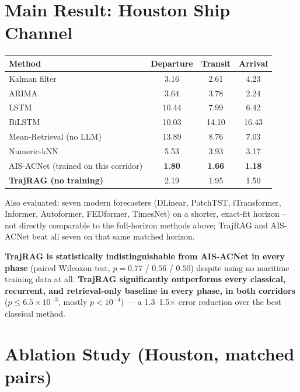 \documentclass[10pt]{article}
\begin{document}
\section*{Main Result: Houston Ship Channel}

\begin{center}
\begin{tabular}{lccc}
\toprule
\textbf{Method} & \textbf{Departure} & \textbf{Transit} & \textbf{Arrival} \\
\midrule
Kalman filter & 3.16 & 2.61 & 4.23 \\
ARIMA & 3.64 & 3.78 & 2.24 \\
LSTM & 10.44 & 7.99 & 6.42 \\
BiLSTM & 10.03 & 14.10 & 16.43 \\
Mean-Retrieval (no LLM) & 13.89 & 8.76 & 7.03 \\
Numeric-kNN & 5.53 & 3.93 & 3.17 \\
AIS-ACNet (trained on this corridor) & \textbf{1.80} & \textbf{1.66} & \textbf{1.18} \\
\textbf{TrajRAG (no training)} & 2.19 & 1.95 & 1.50 \\
\bottomrule
\end{tabular}
\end{center}
\vspace{1pt}
{\footnotesize Also evaluated: seven modern forecasters (DLinear, PatchTST,
iTransformer, Informer, Autoformer, FEDformer, TimesNet) on a shorter,
exact-fit horizon -- not directly comparable to the full-horizon methods
above; TrajRAG and AIS-ACNet beat all seven on that same matched horizon.}
\vspace{0pt}

\textbf{\textcolor{hl}{TrajRAG is statistically indistinguishable from AIS-ACNet in every
phase}} (paired Wilcoxon test, $p = 0.77$ / $0.56$ / $0.50$) despite using
no maritime training data at all. \textbf{TrajRAG significantly outperforms
every classical, recurrent, and retrieval-only baseline in every phase, in
both corridors} ($p \leq 6.5\times10^{-3}$, mostly $p<10^{-4}$) --- a
1.3--1.5$\times$ error reduction over the best classical method.

\section*{Ablation Study (Houston, matched pairs)}
\end{document}
